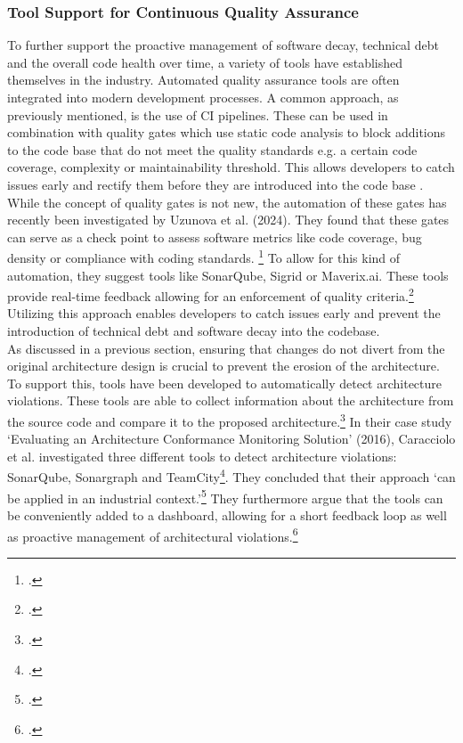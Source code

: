 \subsubsection{Tool Support for Continuous Quality Assurance}
To further support the proactive management of software decay, technical debt and the overall code health over time, a variety of tools have established themselves in the industry.
Automated quality assurance tools are often integrated into modern development processes. A common approach, as previously mentioned, is the use of \ac{CI} pipelines. These can be used in combination with quality gates which use static code analysis to block additions to the code base that do not meet the quality standards e.g. a 
certain code coverage, complexity or maintainability threshold. This allows developers to catch issues early and rectify them before they are introduced into the code base . While the concept of quality gates is not new, the automation of these gates has recently been investigated by Uzunova et al. (2024).
They found that these gates can serve as a check point to assess software metrics like code coverage, bug density or compliance with coding standards. \footcite[8]{uzunovaQualityGatesSoftware2024}
To allow for this kind of automation, they suggest tools like SonarQube, Sigrid or Maverix.ai. These tools provide real-time feedback allowing for an enforcement of quality criteria.\footcite[8]{uzunovaQualityGatesSoftware2024}\\
Utilizing this approach enables developers to catch issues early and prevent the introduction of technical debt and software decay into the codebase.\\

As discussed in a previous section, ensuring that changes do not divert from the original architecture design is crucial to prevent the erosion of the architecture.
To support this, tools have been developed to automatically detect architecture violations. These tools are able to collect information about the architecture from the source code
and compare it to the proposed architecture.\footcite[6]{thomasStaticDynamicArchitecture2017} In their case study 
`Evaluating an Architecture Conformance Monitoring Solution' (2016), Caracciolo et al. investigated three different tools to detect architecture violations:
SonarQube, Sonargraph and TeamCity\footcite[43]{caraccioloEvaluatingArchitectureConformance2016}. They concluded that their approach 
`can be applied in an industrial context.'\footcite[44]{caraccioloEvaluatingArchitectureConformance2016}
They furthermore argue that the tools can be conveniently added to a dashboard, allowing for a short feedback loop as well as proactive management of architectural violations.\footcite[44]{caraccioloEvaluatingArchitectureConformance2016}\\

